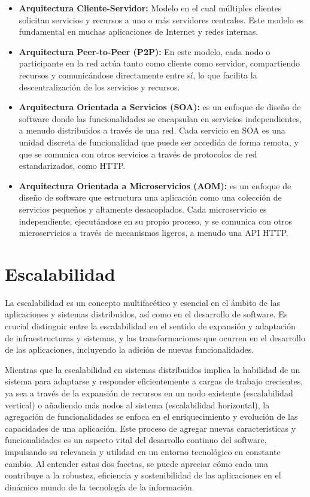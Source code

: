 \begin{itemize}
	\item \textbf{Arquitectura Cliente-Servidor:} Modelo en el cual múltiples clientes solicitan servicios y recursos a uno o más servidores centrales. Este modelo es fundamental en muchas aplicaciones de Internet y redes internas.
	
	\item \textbf{Arquitectura Peer-to-Peer (P2P):} En este modelo, cada nodo o participante en la red actúa tanto como cliente como servidor, compartiendo recursos y comunicándose directamente entre sí, lo que facilita la descentralización de los servicios y recursos.
	
	\item \textbf{Arquitectura Orientada a Servicios (SOA):} es un enfoque de diseño de software donde las funcionalidades se encapsulan en servicios independientes, a menudo distribuidos a través de una red. Cada servicio en SOA es una unidad discreta de funcionalidad que puede ser accedida de forma remota, y que se comunica con otros servicios a través de protocolos de red estandarizados, como HTTP.
	
	\item \textbf{Arquitectura Orientada a Microservicios (AOM):} es un enfoque de diseño de software que estructura una aplicación como una colección de servicios pequeños y altamente desacoplados. Cada microservicio es independiente, ejecutándose en su propio proceso, y se comunica con otros microservicios a través de mecanismos ligeros, a menudo una API HTTP.
\end{itemize}

\section{Escalabilidad}
La escalabilidad es un concepto multifacético y esencial en el ámbito de las aplicaciones y sistemas distribuidos, así como en el desarrollo de software. Es crucial distinguir entre la escalabilidad en el sentido de expansión y adaptación de infraestructuras y sistemas, y las transformaciones que ocurren en el desarrollo de las aplicaciones, incluyendo la adición de nuevas funcionalidades.

Mientras que la escalabilidad en sistemas distribuidos implica la habilidad de un sistema para adaptarse y responder eficientemente a cargas de trabajo crecientes, ya sea a través de la expansión de recursos en un nodo existente (escalabilidad vertical) o añadiendo más nodos al sistema (escalabilidad horizontal), la agregación de funcionalidades se enfoca en el enriquecimiento y evolución de las capacidades de una aplicación. Este proceso de agregar nuevas características y funcionalidades es un aspecto vital del desarrollo continuo del software, impulsando su relevancia y utilidad en un entorno tecnológico en constante cambio. Al entender estas dos facetas, se puede apreciar cómo cada una contribuye a la robustez, eficiencia y sostenibilidad de las aplicaciones en el dinámico mundo de la tecnología de la información.

